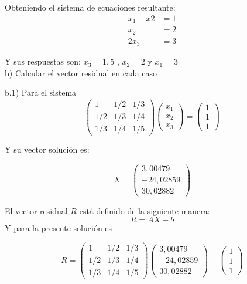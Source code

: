 Obteniendo el sistema de ecuaciones resultante:
\begin{align*}
    x_1-x2 &=1 \\
    x_2 &=2 \\
    2x_3 &=3
\end{align*}

Y sus respuestas son: $x_3=1,5 $ , $x_2=2 $ y $x_1=3$\\

b) Calcular el vector residual en cada caso

b.1) Para el sistema
\begin{equation*}
    \begin{pmatrix}
        1 & 1/2 & 1/3 \\
        1/2 & 1/3 & 1/4 \\
        1/3 & 1/4 & 1/5
    \end{pmatrix}
    \begin{pmatrix}
        x_1 \\
        x_2 \\
        x_3
    \end{pmatrix}    
    =    
    \begin{pmatrix}
        1 \\
        1 \\
        1
    \end{pmatrix}
\end{equation*}

Y su vector solución es:

\begin{equation*}
    X=
    \begin{pmatrix}
        3,00479 \\
        -24,02859 \\
        30,02882
    \end{pmatrix}    
\end{equation*}

El vector residual $R$ está definido de la siguiente manera:
$$ R=AX-b$$
Y para la presente solución es

\begin{equation*}
    R=
    \begin{pmatrix}
        1 & 1/2 & 1/3 \\
        1/2 & 1/3 & 1/4 \\
        1/3 & 1/4 & 1/5
    \end{pmatrix}
    \begin{pmatrix}
        3,00479 \\
        -24,02859 \\
        30,02882
    \end{pmatrix}    
    -   
    \begin{pmatrix}
        1 \\
        1 \\
        1
    \end{pmatrix}
\end{equation*}

